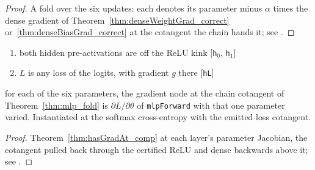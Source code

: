 \begin{proof}
\leanok
A fold over the six updates: each denotes its parameter minus \(\alpha\)
times the dense gradient of Theorem~\ref{thm:denseWeightGrad_correct}
or~\ref{thm:denseBiasGrad_correct} at the cotangent the chain hands it;
see .
\end{proof}

\begin{theorem}
  \label{thm:mlp_loss_grad}
  \leanok
  \Assume{}
  \begin{enumerate}
    \item both hidden pre-activations are off the ReLU kink
          \hfill[\texttt{h\(_0\)}, \texttt{h\(_1\)}]
    \item \(L\) is any loss of the logits, with gradient \(g\) there
          \hfill[\texttt{hL}]
  \end{enumerate}
  \Prove{} for each of the six parameters, the gradient node at the chain
  cotangent of Theorem~\ref{thm:mlp_fold} is \(\partial L/\partial\theta\) of
  \texttt{mlpForward} with that one parameter varied. Instantiated at the
  softmax cross-entropy with the emitted loss cotangent.
\end{theorem}

\begin{proof}
\leanok
Theorem~\ref{thm:hasGradAt_comp} at each layer's parameter Jacobian, the
cotangent pulled back through the certified ReLU and dense backwards
above it; see .
\end{proof}

